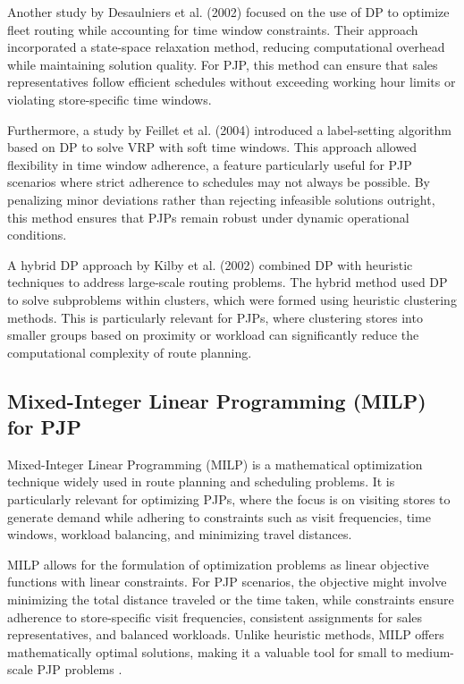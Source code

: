 Another study by Desaulniers et al. (2002) \cite{Desaulniers2002} focused on the use of DP to optimize fleet routing while accounting for time window constraints. Their approach incorporated a state-space relaxation method, reducing computational overhead while maintaining solution quality. For PJP, this method can ensure that sales representatives follow efficient schedules without exceeding working hour limits or violating store-specific time windows.

Furthermore, a study by Feillet et al. (2004) \cite{Feillet2004} introduced a label-setting algorithm based on DP to solve VRP with soft time windows. This approach allowed flexibility in time window adherence, a feature particularly useful for PJP scenarios where strict adherence to schedules may not always be possible. By penalizing minor deviations rather than rejecting infeasible solutions outright, this method ensures that PJPs remain robust under dynamic operational conditions.

A hybrid DP approach by Kilby et al. (2002) \cite{Kilby2002} combined DP with heuristic techniques to address large-scale routing problems. The hybrid method used DP to solve subproblems within clusters, which were formed using heuristic clustering methods. This is particularly relevant for PJPs, where clustering stores into smaller groups based on proximity or workload can significantly reduce the computational complexity of route planning.


\subsection{Mixed-Integer Linear Programming (MILP) for PJP}
Mixed-Integer Linear Programming (MILP) is a mathematical optimization technique widely used in route planning and scheduling problems. It is particularly relevant for optimizing PJPs, where the focus is on visiting stores to generate demand while adhering to constraints such as visit frequencies, time windows, workload balancing, and minimizing travel distances.

MILP allows for the formulation of optimization problems as linear objective functions with linear constraints. For PJP scenarios, the objective might involve minimizing the total distance traveled or the time taken, while constraints ensure adherence to store-specific visit frequencies, consistent assignments for sales representatives, and balanced workloads. Unlike heuristic methods, MILP offers mathematically optimal solutions, making it a valuable tool for small to medium-scale PJP problems \cite{Laporte2017}.

